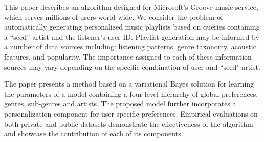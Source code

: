 This paper describes an algorithm designed for Microsoft's Groove music service, which serves millions of users world wide.  We consider the problem of automatically generating personalized music playlists based on queries containing a ``seed'' artist and the listener's user ID. 
Playlist generation may be informed by a number of data sources including: listening patterns, genre taxonomy, acoustic features, and popularity. The importance assigned to each of these information sources may vary depending on the specific combination of user and ``seed" artist.

The paper presents a method based on a variational Bayes solution for learning the parameters of a model containing a four-level hierarchy of global preferences, genres, sub-genres and artists. The proposed model further incorporates a personalization component for user-specific preferences.
Empirical evaluations on both private and public datasets demonstrate the effectiveness of the algorithm and showcase the contribution of each of its components.

 
